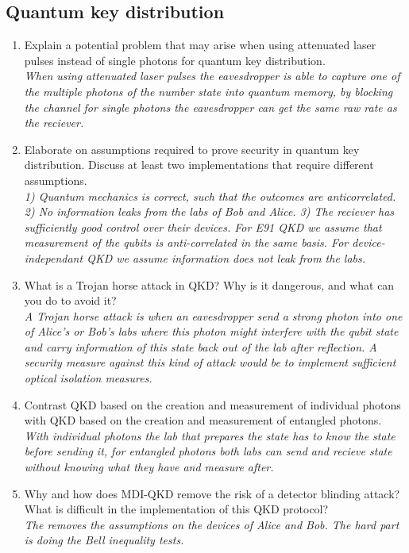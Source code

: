 \documentclass[a4paper]{scrartcl}
\newcommand{\qa}[2]{#1\\ \textit{#2}}
\begin{document}
\subsection*{Quantum key distribution}
\begin{enumerate}[label=(\alph*)]
  \item \qa{Explain a potential problem that may arise when using attenuated laser pulses instead of single photons for quantum key distribution.}{When using attenuated laser pulses the eavesdropper is able to capture one of the multiple photons of the number state into quantum memory, by blocking the channel for single photons the eavesdropper can get the same raw rate as the reciever.}
  \item \qa{Elaborate on assumptions required to prove security in quantum key distribution. Discuss at least two implementations that require different assumptions.}{1) Quantum mechanics is correct, such that the outcomes are anticorrelated. 2) No information leaks from the labs of Bob and Alice. 3) The reciever has sufficiently good control over their devices. For E91 QKD we assume that measurement of the qubits is anti-correlated in the same basis. For device-independant QKD we assume information does not leak from the labs.}
  \item \qa{What is a Trojan horse attack in QKD? Why is it dangerous, and what can you do to avoid it?}{A Trojan horse attack is when an eavesdropper send a strong photon into one of Alice's or Bob's labs where this photon might interfere with the qubit state and carry information of this state back out of the lab after reflection. A security measure against this kind of attack would be to implement sufficient optical isolation measures.}
  \item \qa{Contrast QKD based on the creation and measurement of individual photons with QKD based on the creation and measurement of entangled photons.}{With individual photons the lab that prepares the state has to know the state before sending it, for entangled photons both labs can send and recieve state without knowing what they have and measure after.}
  \item \qa{Why and how does MDI-QKD remove the risk of a detector blinding attack? What is difficult in the implementation of this QKD protocol?}{The removes the assumptions on the devices of Alice and Bob. The hard part is doing the Bell inequality tests.}
\end{enumerate}
\end{document}
